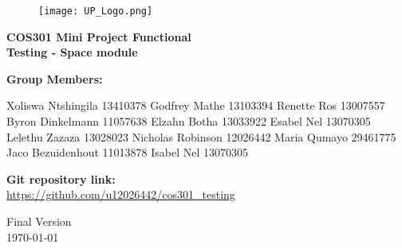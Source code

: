 \begin{titlepage}
	\begin{center}
		
		\begin{figure}[t]
			\centering
			\texttt{[image: UP\_Logo.png]}
		\end{figure}		
		
		\textbf{\LARGE COS301 Mini Project Functional \\Testing - Space module\\}
		
		\vspace{1 cm}
		
		\LARGE{\textbf{Group Members: }}
		

		\begin{flushright} \large
			Xoliswa Ntshingila 13410378\newline
			Godfrey Mathe 13103394 \newline
			Renette Ros 13007557\newline
			Byron Dinkelmann 11057638\newline
			Elzahn Botha 13033922\newline
			Esabel Nel 13070305\newline
			Lelethu Zazaza 13028023\newline
			Nicholas Robinson 12026442\newline
			Maria Qumayo 29461775\newline
			Jaco Bezuidenhout 11013878\newline
			Isabel Nel 13070305\newline
		\end{flushright}
		
	
		
		\textbf{Git repository link:\\}
		 \url{ https://github.com/u12026442/cos301_testing}
		
		\vfill
		
		{\LARGE Final Version}
		\\
		{\large \today}		
		
		
	\end{center}
\end{titlepage}
